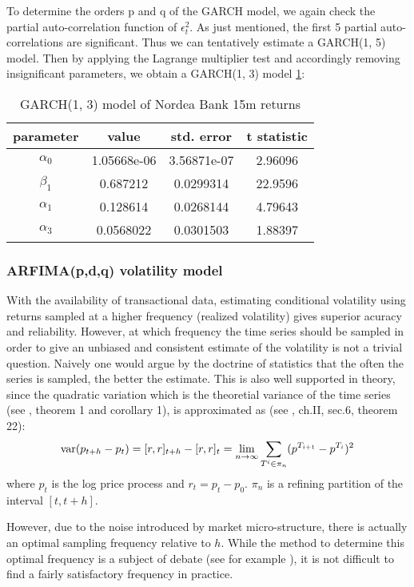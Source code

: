 \documentclass{book}
\begin{document}
To determine the orders p and q of the GARCH model, we again check
the partial auto-correlation function of $\epsilon_t^2$. As just
mentioned, the first 5 partial auto-correlations are significant. Thus
we can tentatively estimate a GARCH(1, 5) model. Then by applying the
Lagrange multiplier test and accordingly removing insignificant
parameters, we obtain a GARCH(1, 3) model
\ref{tab:nordea_15min_garch}:
\begin{table}[htb!]
  \centering
  \begin{tabular}{c|c|c|c}
    parameter & value & std. error & t statistic \\
    \hline
     $\alpha_0$ &   1.05668e-06 &   3.56871e-07 &    2.96096\\
     \hline
     $\beta_1$  &     0.687212  &   0.0299314   &    22.9596\\
     \hline
     $\alpha_1$ &      0.128614 &   0.0268144   &    4.79643\\
     \hline
     $\alpha_3$ &    0.0568022  &   0.0301503   &    1.88397
  \end{tabular}
  \caption{GARCH(1, 3) model of Nordea Bank 15m returns}
  \label{tab:nordea_15min_garch}
\end{table}

\subsubsection{ARFIMA(p,d,q) volatility model}
With the availability of transactional data, estimating conditional
volatility using returns sampled at a higher frequency (realized
volatility) gives superior acuracy and reliability. However, at which
frequency the time series should be sampled in order to give an
unbiased and consistent estimate of the volatility is not a trivial
question. Naively one would argue by the doctrine of statistics that
the often the series is sampled, the better the estimate. This is also
well supported in theory, since the quadratic variation which is the
theoretial variance of the time series (see \cite{Andersen03}, theorem
1 and corollary 1), is approximated as (see \cite{Protter05}, ch.II,
sec.6, theorem 22):
\[
\text{var}(p_{t+h} - p_t) = [r, r]_{t+h} - [r, r]_t = \lim_{n \to \infty}
\sum_{T^i \in \pi_n} (p^{T_{i+1}} - p^{T_i})^2
\]
where $p_t$ is the log price process and $r_t = p_t - p_0$. $\pi_n$
is a refining partition of the interval $[t, t+h]$.

However, due to the noise introduced by market micro-structure, there
is actually an optimal sampling frequency relative to $h$. While the
method to determine this optimal frequency is a subject of debate (see
for example \cite{Sahalia05}), it is not difficult to find a fairly
satisfactory frequency in practice.
\end{document}

